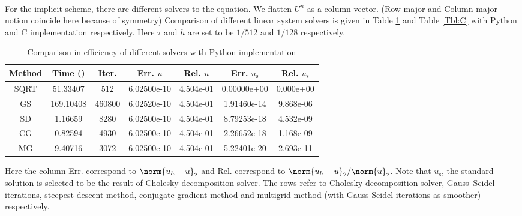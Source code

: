 \documentclass[english, nochinese]{pkupaper}
\begin{document}
\begin{thmquestion}
\ 
\begin{thmanswer}
For the implicit scheme, there are different solvers to the equation. We flatten $U^n$ as a column vector. (Row major and Column major notion coincide here because of symmetry) Comparison of different linear system solvers is given in Table \ref{Tbl:Python} and Table \ref{Tbl:C} with Python and C implementation respectively. Here $\tau$ and $h$ are set to be $ 1 / 512 $ and $ 1 / 128 $ respectively.

\begin{table}[htbp]
{
\centering
\caption{Comparison in efficiency of different solvers with Python implementation}
\label{Tbl:Python}
\begin{tabular}{|c|c|c|c|c|c|c|}
\hline
Method & Time (\Si{s}) & Iter. & Err. $u$ & Rel. $u$ & Err. $u_{\text{s}}$ & Rel. $u_{\text{s}}$ \\
\hline
SQRT & 51.33407 & 512 & 6.02500e-10 & 4.504e-01 & 0.00000e+00 & 0.000e+00 \\
\hline
GS & 169.10408 & 460800 & 6.02520e-10 & 4.504e-01 & 1.91460e-14 & 9.868e-06 \\
\hline
SD & 1.16659 & 8280 & 6.02500e-10 & 4.504e-01 & 8.79253e-18 & 4.532e-09 \\
\hline
CG & 0.82594 & 4930 & 6.02500e-10 & 4.504e-01 & 2.26652e-18 & 1.168e-09 \\
\hline
MG & 9.40716 & 3072 & 6.02500e-10 & 4.504e-01 & 5.22401e-20 & 2.693e-11 \\
\hline
\end{tabular}
}
\vskip 6pt
\footnotesize
Here the column Err. correspond to $ \norm{ u_h - u }_2 $ and Rel. correspond to $ \norm{ u_h - u }_2 / \norm{u}_2 $. Note that $u_{\text{s}}$, the standard solution is selected to be the result of Cholesky decomposition solver. The rows refer to Cholesky decomposition solver, Gauss--Seidel iterations, steepest descent method, conjugate gradient method and multigrid method (with Gauss-Seidel iterations as smoother) respectively.
\end{table}


\end{thmanswer}
\end{thmquestion}
\end{document}
